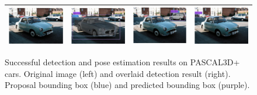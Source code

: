 \documentclass[10pt,twocolumn,letterpaper]{article}
\begin{document}
\begin{figure}[h]
\begin{tabular}{|cc|cc|}
  \includegraphics[width=0.24\linewidth]{supp/pas_car18a.png} &
  \includegraphics[width=0.24\linewidth]{supp/pas_car18b.png} & 
  \includegraphics[width=0.24\linewidth]{supp/pas_car18c.png} &
  \includegraphics[width=0.24\linewidth]{supp/pas_car18d.png} \\
  \hline
  \end{tabular}
  \caption{Successful detection and pose estimation results on
    PASCAL3D+~\cite{Xiang14} cars. Original image (left) and
  overlaid detection result (right). Proposal bounding box (blue) and
  predicted bounding box (purple).}
  \label{fig:pascal3d_car_good}
\end{figure}
\end{document}
